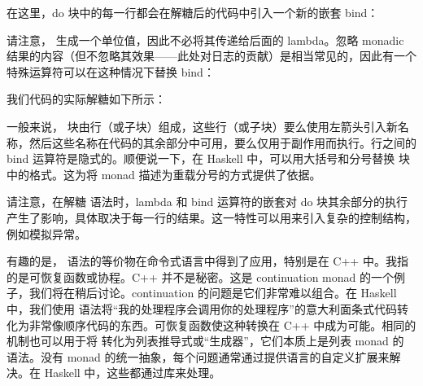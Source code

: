 在这里，do 块中的每一行都会在解糖后的代码中引入一个新的嵌套 bind：

请注意， 生成一个单位值，因此不必将其传递给后面的 lambda。忽略 monadic 结果的内容（但不忽略其效果——此处对日志的贡献）是相当常见的，因此有一个特殊运算符可以在这种情况下替换 bind：

我们代码的实际解糖如下所示：

一般来说， 块由行（或子块）组成，这些行（或子块）要么使用左箭头引入新名称，然后这些名称在代码的其余部分中可用，要么仅用于副作用而执行。行之间的 bind 运算符是隐式的。顺便说一下，在 Haskell 中，可以用大括号和分号替换  块中的格式。这为将 monad 描述为重载分号的方式提供了依据。

请注意，在解糖  语法时，lambda 和 bind 运算符的嵌套对 do 块其余部分的执行产生了影响，具体取决于每一行的结果。这一特性可以用来引入复杂的控制结构，例如模拟异常。

有趣的是， 语法的等价物在命令式语言中得到了应用，特别是在 C++ 中。我指的是可恢复函数或协程。C++  并不是秘密。这是 continuation monad 的一个例子，我们将在稍后讨论。continuation 的问题是它们非常难以组合。在 Haskell 中，我们使用  语法将“我的处理程序会调用你的处理程序”的意大利面条式代码转化为非常像顺序代码的东西。可恢复函数使这种转换在 C++ 中成为可能。相同的机制也可以用于将  转化为列表推导式或“生成器”，它们本质上是列表 monad 的  语法。没有 monad 的统一抽象，每个问题通常通过提供语言的自定义扩展来解决。在 Haskell 中，这些都通过库来处理。
